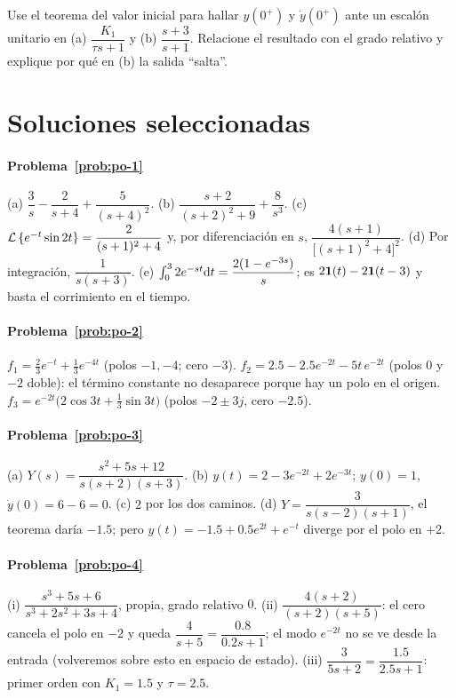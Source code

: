 \begin{problema}\label{prob:po-8}
\etiquetaEstrella{} Use el teorema del valor inicial para hallar $y(0^+)$ y $\dot y(0^+)$ ante un escalón unitario en (a) $\dfrac{K_1}{\tau s+1}$ y (b) $\dfrac{s+3}{s+1}$. Relacione el resultado con el grado relativo y explique por qué en (b) la salida ``salta''.
\end{problema}

\section{Soluciones seleccionadas}

\paragraph{Problema~\ref{prob:po-1}}
(a) $\dfrac3s-\dfrac2{s+4}+\dfrac5{(s+4)^2}$. (b) $\dfrac{s+2}{(s+2)^2+9}+\dfrac8{s^3}$. (c) $\mathcal{L}\left\{e^{-t}\sin2t\right\}=\dfrac{2}{(s+1)^2+4}$ y, por diferenciación en $s$, $\dfrac{4(s+1)}{\bigl[(s+1)^2+4\bigr]^2}$. (d) Por integración, $\dfrac{1}{s(s+3)}$. (e) $\int_0^3 2e^{-st}\mathrm{d} t=\dfrac{2(1-e^{-3s})}{s}$; es $2\mathbf{1}(t)-2\mathbf{1}(t-3)$ y basta el corrimiento en el tiempo.

\paragraph{Problema~\ref{prob:po-2}}
$f_1=\tfrac23e^{-t}+\tfrac13e^{-4t}$ (polos $-1,-4$; cero $-3$). $f_2=2.5-2.5e^{-2t}-5t\,e^{-2t}$ (polos $0$ y $-2$ doble): el término constante no desaparece porque hay un polo en el origen. $f_3=e^{-2t}\bigl(2\cos3t+\tfrac13\sin3t\bigr)$ (polos $-2\pm3j$, cero $-2.5$).

\paragraph{Problema~\ref{prob:po-3}}
(a) $Y(s)=\dfrac{s^2+5s+12}{s(s+2)(s+3)}$. (b) $y(t)=2-3e^{-2t}+2e^{-3t}$; $y(0)=1$, $\dot y(0)=6-6=0$. (c) $2$ por los dos caminos. (d) $Y=\dfrac{3}{s(s-2)(s+1)}$, el teorema daría $-1.5$; pero $y(t)=-1.5+0.5e^{2t}+e^{-t}$ diverge por el polo en $+2$.

\paragraph{Problema~\ref{prob:po-4}}
(i) $\dfrac{s^3+5s+6}{s^3+2s^2+3s+4}$, propia, grado relativo $0$. (ii) $\dfrac{4(s+2)}{(s+2)(s+5)}$: el cero cancela el polo en $-2$ y queda $\dfrac{4}{s+5}=\dfrac{0.8}{0.2s+1}$; el modo $e^{-2t}$ no se ve desde la entrada (volveremos sobre esto en espacio de estado). (iii) $\dfrac{3}{5s+2}=\dfrac{1.5}{2.5s+1}$: primer orden con $K_1=1.5$ y $\tau=2.5$.

